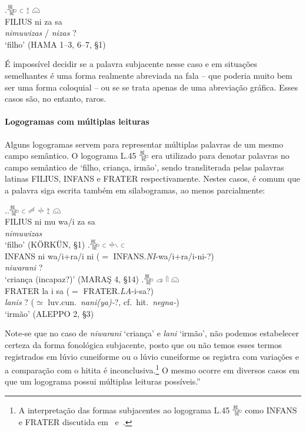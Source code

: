 \exg.\Large 𔐰 \Large 𔗐 \Large 𔖪 \Large 𔗔\\
FILIUS ni za sa\\
\emph{nimuwizas} \slash{} \emph{nizas}{ }?\\
`filho' (HAMA 1–3, 6–7, §1)

É impossível decidir se a palavra subjacente nesse caso e em situações
semelhantes é uma forma realmente abreviada na fala  -- que poderia muito bem ser
uma forma coloquial -- ou se se trata apenas de uma abreviação gráfica.
Esses casos são, no entanto, raros.

\paragraph{Logogramas com múltiplas leituras}
Alguns logogramas servem para representar múltiplas palavras de um mesmo campo
semântico.
O logograma L.45 𔐰 era utilizado para denotar palavras no campo semântico de
`filho, criança, irmão', sendo transliterada pelas palavras latinas FILIUS,
INFANS e FRATER respectivamente. Nestes casos, é comum que a palavra siga
escrita também em silabogramas, ao menos parcialmente:

\ex.\ag.\Large 𔐰 \Large 𔗐 \Large 𔑿 \Large 𔗬 \Large 𔖪 \Large 𔗔\\
FILIUS ni mu wa\slash{}i za sa\\
\emph{nimuwizas} \\
`filho' (KÖRKÜN, §1)
\bg.\Large 𔐰 \Large 𔗐 \Large 𔗬𔖱 \Large 𔗐\\
INFANS ni wa\slash{}i+ra\slash{}i ni ($=$ INFANS.\emph{NI}-wa/i+ra/i-ni-?)\\
\emph{niwarani}{ }? \\
`criança (incapaz?)' (MARAŞ 4, §14)
\bg.\Large 𔐰 \Large 𔓊 \Large 𔓯 \Large 𔗔\\
FRATER la i sa ($=$ FRATER.\emph{LA}-i-sa?)\\
\emph{lanis}{ }?  ($\simeq$ luv.cun.\ \emph{nani{(ya)}-}?, cf.\ hit.\ \emph{negna-})\\
`irmão' (ALEPPO 2, §3)


\noindent Note-se que no caso de \emph{niwarani} `criança' e \emph{lani} `irmão',
não podemos estabelecer certeza da forma fonológica subjacente, posto que ou não
temos esses termos registrados em lúvio cuneiforme ou o lúvio cuneiforme os
registra com variações e a comparação com o hitita
é inconclusiva.\footnote{A interpretação das formas subjacentes ao logograma
	L.45 𔐰 como INFANS e FRATER discutida em~\citet[143--6]{Hawkins1980}
	e~\citet[387]{Yakubovich2010b}.}
O mesmo ocorre em diversos casos em que um logograma possui múltiplas leituras
possíveis.''

